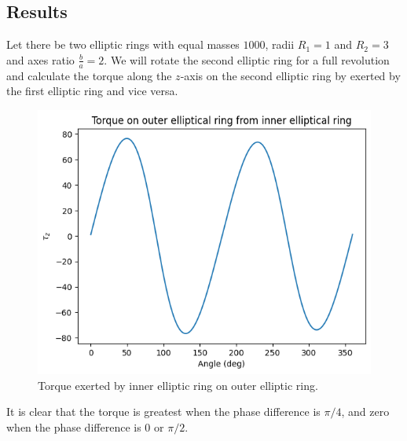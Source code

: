 \subsection{Results}
Let there be two elliptic rings with equal masses \( 1000 \),
radii \( R_1 = 1 \) and \( R_2 = 3 \) and axes ratio \( \frac{b}{a} = 2 \).
We will rotate the second elliptic ring for a full revolution and calculate the torque along the
\( z \)-axis on the second elliptic ring by exerted by the first elliptic ring and vice versa.

\begin{figure}[h!]
    \begin{center}
        \includegraphics[scale=0.9]{resources/torque_on_outer_ellipse.png}
        \caption{Torque exerted by inner elliptic ring on outer elliptic ring.}
        \label{results::inner_on_outer}
    \end{center}
\end{figure}

It is clear that the torque is greatest when the phase difference is \( \pi / 4 \), and zero
when the phase difference is \( 0 \) or \( \pi / 2 \).